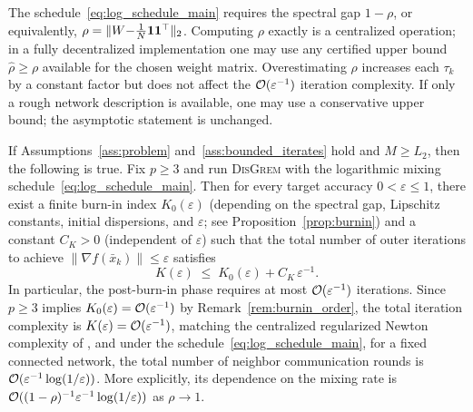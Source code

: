 \documentclass[review,onefignum,onetabnum]{siamart171218}
\begin{document}
	\begin{remark}\label{rem:rho_knowledge}
		The schedule~\eqref{eq:log_schedule_main} requires the spectral
		gap $1{-}\rho$, or equivalently, $\rho=\|W{-}\frac{1}{N}\mathbf{1}\mathbf{1}^\top\|_2$.
		Computing $\rho$ exactly is a centralized operation; in a fully
		decentralized implementation one may use any certified upper
		bound $\hat\rho\ge\rho$ available for the chosen weight matrix.
		Overestimating $\rho$ increases each $\tau_k$ by a constant
		factor but does not affect the $\mathcal{O}(\varepsilon^{-1})$ iteration
		complexity.
		If only a rough network description is available, one may use a
		conservative upper bound; the asymptotic statement is unchanged.
	\end{remark}
	
	\begin{theorem}\label{thm:main}
		If Assumptions~\ref{ass:problem} and~\ref{ass:bounded_iterates}
		hold and $M\ge L_2$, then the following is true.
		Fix $p\ge3$ and run \textsc{DisGrem} with the logarithmic mixing schedule~\eqref{eq:log_schedule_main}.
		Then for every target accuracy $0<\varepsilon\le1$, there exist a finite burn-in index $K_0(\varepsilon)$
		(depending on the spectral gap, Lipschitz constants, initial dispersions, and $\varepsilon$;
		see Proposition~\ref{prop:burnin})
		and a constant $C_K>0$ (independent of $\varepsilon$) such that the total number of
		outer iterations to achieve $\|\nabla f(\bar x_k)\|\le \varepsilon$ satisfies
		\[
		K(\varepsilon)\;\le\; K_0(\varepsilon) + C_K\,\varepsilon^{-1}.
		\]
		In particular, the post-burn-in phase requires at most
		$\mathcal{O}(\varepsilon^{-1})$ iterations. Since $p\ge3$ implies
		$K_0(\varepsilon)=\mathcal{O}(\varepsilon^{-1})$ by
		Remark~\ref{rem:burnin_order}, the total iteration complexity
		is $K(\varepsilon)=\mathcal{O}(\varepsilon^{-1})$, matching the
		centralized regularized Newton complexity of \citet{mishchenko2023rn},
		and under the schedule~\eqref{eq:log_schedule_main}, for a fixed
		connected network, the total number of neighbor communication
		rounds is $\mathcal{O}(\varepsilon^{-1}\log(1/\varepsilon))$.
		More explicitly, its dependence on the mixing rate is
		$\mathcal{O}((1-\rho)^{-1}\varepsilon^{-1}\log(1/\varepsilon))$ as
		$\rho\to1$.
	\end{theorem}
	
\end{document}
